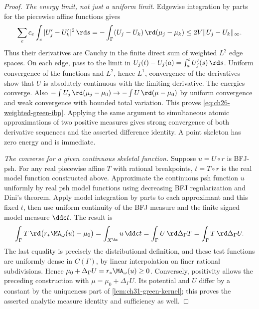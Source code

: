 \begin{proof}
\emph{The energy limit, not just a uniform limit.}
Edgewise integration by parts for the piecewise affine functions gives
\[
 \sum_e c_e\int_e|U_j'-U_k'|^2\,\rd s
 =-\int_\Gamma(U_j-U_k)\,\rd(\mu_j-\mu_k)
 \leq 2V\lVert U_j-U_k\rVert_\infty.
\]
Thus their derivatives are Cauchy in the finite direct sum of weighted
\(L^2\) edge spaces.  On each edge, pass to the limit in
\(U_j(t)-U_j(a)=\int_a^tU_j'(s)\,\rd s\).  Uniform convergence of the
functions and \(L^2\), hence \(L^1\), convergence of the derivatives
show that \(U\) is absolutely continuous with the limiting derivative.
The energies converge.  Also
\(-\int U_j\,\rd(\mu_j-\mu_0)\to-\int U\,\rd(\mu-\mu_0)\)
by uniform convergence and weak convergence with bounded total variation.
This proves \eqref{eq:ch26-weighted-green-ibp}.  Applying the same argument
to simultaneous atomic approximations of two positive measures gives
strong convergence of both derivative sequences and the asserted
difference identity.  A point skeleton has zero energy and is immediate.

\emph{The converse for a given continuous skeletal function.}
Suppose \(u=U\circ r\) is BFJ-psh.  For any real piecewise affine
\(T\) with rational breakpoints, \(t=T\circ r\) is the real model
function constructed above.  Approximate the continuous psh function
\(u\) uniformly by real psh model functions using decreasing BFJ
regularization and Dini's theorem.  Apply model integration by parts to
each approximant and this fixed \(t\), then use uniform continuity of
the BFJ measure and the finite signed model measure \(\ddc t\).  The
result is
\[
 \int_\Gamma T\,\rd\bigl(r_*\MA_\omega(u)-\mu_0\bigr)
 =\int_{X^{\An}}u\,\ddc t
 =\int_\Gamma U\,\rd\Delta_\Gamma T
 =\int_\Gamma T\,\rd\Delta_\Gamma U.
\]
The last equality is precisely the distributional definition, and these
test functions are uniformly dense in \(C(\Gamma)\), by linear
interpolation on finer rational subdivisions.  Hence
\(\mu_0+\Delta_\Gamma U=r_*\MA_\omega(u)\geq0\).
Conversely, positivity allows the preceding construction with
\(\mu=\mu_0+\Delta_\Gamma U\).  Its potential and \(U\) differ by
a constant by the uniqueness part of \cref{lem:ch31-green-kernel}; this
proves the asserted analytic measure identity and sufficiency as well.
\end{proof}

